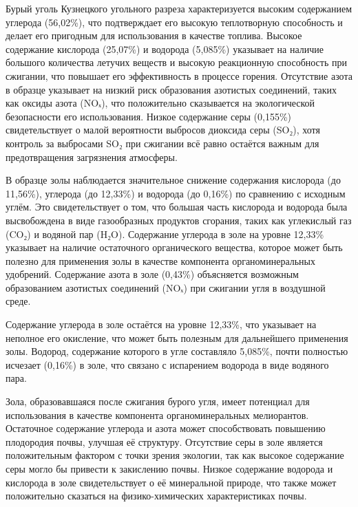 \begin{multicols}{2}
Бурый уголь Кузнецкого угольного разреза характеризуется высоким
содержанием углерода (56,02\%), что подтверждает его высокую
теплотворную способность и делает его пригодным для использования в
качестве топлива. Высокое содержание кислорода (25,07\%) и водорода
(5,085\%) указывает на наличие большого количества летучих веществ и
высокую реакционную способность при сжигании, что повышает его
эффективность в процессе горения. Отсутствие азота в образце указывает
на низкий риск образования азотистых соединений, таких как оксиды азота
(NOₓ), что положительно сказывается на экологической безопасности его
использования. Низкое содержание серы (0,155\%) свидетельствует о малой
вероятности выбросов диоксида серы (SO₂), хотя контроль за выбросами SO₂
при сжигании всё равно остаётся важным для предотвращения загрязнения
атмосферы.

В образце золы наблюдается значительное снижение содержания кислорода
(до 11,56\%), углерода (до 12,33\%) и водорода (до 0,16\%) по сравнению
с исходным углём. Это свидетельствует о том, что большая часть кислорода
и водорода была высвобождена в виде газообразных продуктов сгорания,
таких как углекислый газ (CO₂) и водяной пар (H₂O). Содержание углерода
в золе на уровне 12,33\% указывает на наличие остаточного органического
вещества, которое может быть полезно для применения золы в качестве
компонента органоминеральных удобрений. Содержание азота в золе (0,43\%)
объясняется возможным образованием азотистых соединений (NOₓ) при
сжигании угля в воздушной среде.

Содержание углерода в золе остаётся на уровне 12,33\%, что указывает на
неполное его окисление, что может быть полезным для дальнейшего
применения золы. Водород, содержание которого в угле составляло 5,085\%,
почти полностью исчезает (0,16\%) в золе, что связано с испарением
водорода в виде водяного пара.

Зола, образовавшаяся после сжигания бурого угля, имеет потенциал для
использования в качестве компонента органоминеральных мелиорантов.
Остаточное содержание углерода и азота может способствовать повышению
плодородия почвы, улучшая её структуру. Отсутствие серы в золе является
положительным фактором с точки зрения экологии, так как высокое
содержание серы могло бы привести к закислению почвы. Низкое содержание
водорода и кислорода в золе свидетельствует о её минеральной природе,
что также может положительно сказаться на физико-химических
характеристиках почвы.


\end{multicols}
